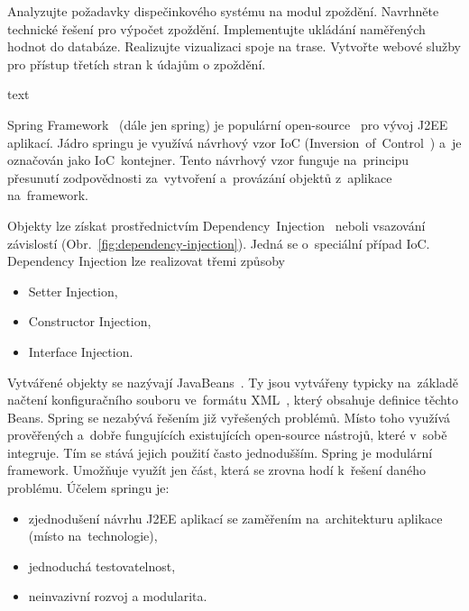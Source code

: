 
Analyzujte požadavky dispečinkového systému na modul zpoždění.
Navrhněte technické řešení pro výpočet zpoždění.
Implementujte ukládání naměřených hodnot do databáze.
Realizujte vizualizaci spoje na trase.
Vytvořte webové služby pro přístup třetích stran k údajům o zpoždění.



text

Spring Framework~\cite{spring-framework} (dále jen spring) je populární open-source~\cite{open-source} pro vývoj J2EE~\cite{j2ee} aplikací. Jádro springu je využívá návrhový vzor IoC (Inversion~of~Control~\cite{ioc}) a~je označován jako IoC~kontejner. Tento návrhový vzor funguje na~principu přesunutí zodpovědnosti za~vytvoření a~provázání objektů z~aplikace na~framework.

Objekty lze získat prostřednictvím Dependency~Injection~\cite{dependency-injection} neboli vsazování závislostí (Obr.~\ref{fig:dependency-injection}). Jedná se o~speciální případ IoC. Dependency Injection lze realizovat třemi způsoby
\begin{itemize}
	\setlength{\parskip}{0pt}
	\setlength{\itemsep}{0pt}
	\item {Setter Injection,}
	\item {Constructor Injection,}
	\item {Interface Injection.}
\end{itemize}


Vytvářené objekty se nazývají JavaBeans~\cite{java-beans}. Ty jsou vytvářeny typicky na~základě načtení konfiguračního souboru ve~formátu XML~\cite{xml}, který obsahuje definice těchto Beans. Spring se nezabývá řešením již vyřešených problémů. Místo toho využívá prověřených a~dobře fungujících existujících open-source nástrojů, které v~sobě integruje. Tím se stává jejich použití často jednodušším. Spring je modulární framework. Umožňuje využít jen část, která se zrovna hodí k~řešení daného problému. Účelem springu je:
\begin{itemize}
	\setlength{\parskip}{0pt}
	\setlength{\itemsep}{0pt}
	\item {zjednodušení návrhu J2EE aplikací se zaměřením na~architekturu aplikace (místo na~technologie),}
	\item {jednoduchá testovatelnost,}
	\item {neinvazivní rozvoj a modularita.}
\end{itemize}


